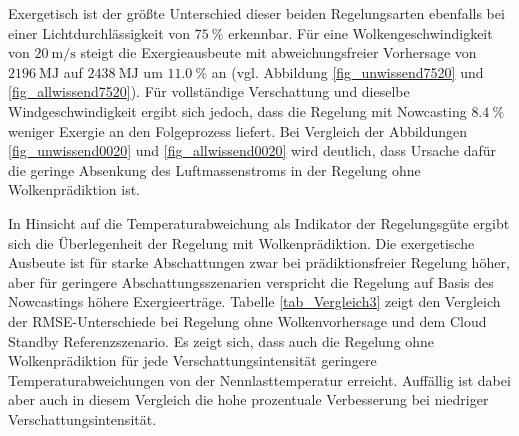 Exergetisch ist der größte Unterschied dieser beiden Regelungsarten ebenfalls bei einer Lichtdurchlässigkeit von $\SI{75}{\percent}$ erkennbar.
Für eine Wolkengeschwindigkeit von $\SI{20}{\metre\per\second}$ steigt die Exergieausbeute mit abweichungsfreier Vorhersage von $\SI{2196}{\mega\joule}$ auf $\SI{2438}{\mega\joule}$ um $\SI{11.0}{\percent}$ an (vgl. Abbildung \ref{fig_unwissend7520} und \ref{fig_allwissend7520}).
Für vollständige Verschattung und dieselbe Windgeschwindigkeit ergibt sich jedoch, dass die Regelung mit Nowcasting $\SI{8.4}{\percent}$ weniger Exergie an den Folgeprozess liefert.
Bei Vergleich der Abbildungen \ref{fig_unwissend0020} und \ref{fig_allwissend0020} wird deutlich, dass Ursache dafür die geringe Absenkung des Luftmassenstroms in der Regelung ohne Wolkenprädiktion ist.

In Hinsicht auf die Temperaturabweichung als Indikator der Regelungsgüte ergibt sich die Überlegenheit der Regelung mit Wolkenprädiktion.
Die exergetische Ausbeute ist für starke Abschattungen zwar bei prädiktionsfreier Regelung höher, aber für geringere Abschattungsszenarien verspricht die Regelung auf Basis des Nowcastings höhere Exergieerträge.
Tabelle \ref{tab_Vergleich3} zeigt den Vergleich der RMSE-Unterschiede bei Regelung ohne Wolkenvorhersage und dem Cloud Standby Referenzszenario.
Es zeigt sich, dass auch die Regelung ohne Wolkenprädiktion für jede Verschattungsintensität geringere Temperaturabweichungen von der Nennlasttemperatur erreicht.
Auffällig ist dabei aber auch in diesem Vergleich die hohe prozentuale Verbesserung bei niedriger Verschattungsintensität.

